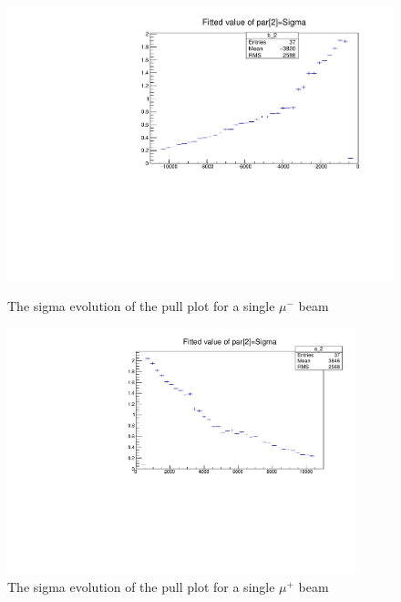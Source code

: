 \begin{figure}[h!]
	\begin{minipage}{0.49\linewidth}
		\centerline{\includegraphics[width=0.9\linewidth]{figures/musigma.pdf}}
			\caption[]{The sigma evolution of the pull plot for a single $\mu^-$ beam}
		\label{fig:sigmamu}
	\end{minipage}
	\hfill
	\begin{minipage}{0.49\linewidth}
		\centerline{\includegraphics[width=0.9\textwidth]{figures/antimusigma.pdf}}
		\caption[]{The sigma evolution of the pull plot for a single $\mu^+$ beam}
		\label{fig:sigmaantimu}
	\end{minipage}
\end{figure}

